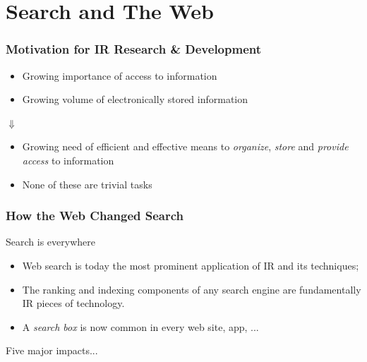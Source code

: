 \documentclass[svgnames]{beamer}
\begin{document}
\section{Search and The Web}


\begin{frame}
    \frametitle{Motivation for IR Research \& Development}

    \begin{block}{}
        \begin{itemize}
        \item Growing importance of access to information
        \item Growing volume of electronically stored information
        \end{itemize}
    \end{block}

    \begin{center}
        {\Huge $\Downarrow$}
    \end{center}

    \begin{block}{}
        \begin{itemize}
        \item Growing need of efficient and effective means to \emph{organize},
            \emph{store} and \emph{provide access} to information
        \item None of these are trivial tasks
        \end{itemize}
    \end{block}
\end{frame}


\begin{frame}
    \frametitle{How the Web Changed Search}

    \begin{block}{Search is everywhere}

        \begin{itemize}
        \item Web search is today the most prominent application of IR and its
            techniques;
        \item The ranking and indexing components of any search engine are fundamentally IR pieces of technology. 

        \item A \emph{search box} is now common in every web site, app, ...

        \end{itemize}
    \end{block}

    \begin{block}{}
        Five major impacts...
    \end{block}


\end{frame}
\end{document}
